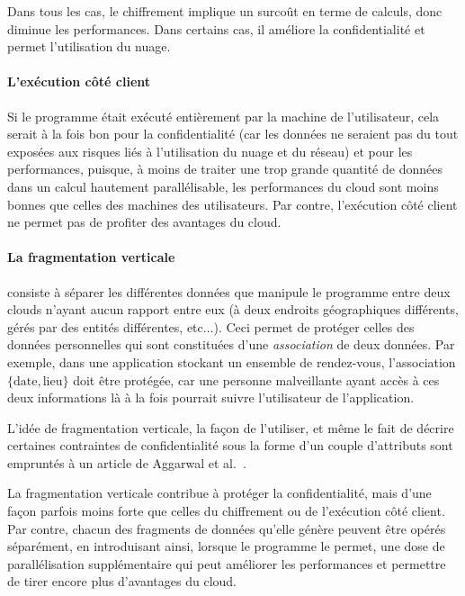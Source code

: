 Dans tous les cas, le chiffrement implique un surcoût en terme de calculs,
donc diminue les performances. Dans certains cas, il améliore la confidentialité
et permet l'utilisation du nuage.

\paragraph{L'exécution côté client}
Si le programme était exécuté entièrement par la machine de l'utilisateur,
cela serait à la fois bon pour la confidentialité (car les données
ne seraient pas du tout exposées aux risques liés à l'utilisation du nuage
et du réseau) et pour les performances, puisque, à moins de traiter une 
trop grande quantité de données dans un calcul hautement parallélisable,
les performances du cloud sont moins bonnes que celles des machines des utilisateurs.
Par contre, l'exécution côté client ne permet pas de profiter des avantages du cloud.

\paragraph{La fragmentation verticale} consiste à séparer les différentes données
que manipule le programme entre deux clouds n'ayant aucun rapport entre eux
(à deux endroits géographiques différents, gérés par des entités différentes,
etc$\dots$).
Ceci permet de protéger celles des données personnelles qui sont constituées d'une
\emph{association} de deux données. Par exemple, dans une application stockant
un ensemble de rendez-vous, l'association $\{\mathrm{date}, \mathrm{lieu}\}$
doit être protégée, car une personne malveillante ayant accès à ces deux
informations là à la fois pourrait suivre l'utilisateur de l'application.

L'idée de fragmentation verticale, la façon de l'utiliser,
et même le fait de décrire certaines contraintes de
confidentialité sous la forme d'un couple d'attributs
sont empruntés à un article de 
Aggarwal et al.~\cite{aggar}.

La fragmentation verticale contribue à protéger la confidentialité,
mais d'une façon parfois moins forte que celles du chiffrement
ou de l'exécution côté client. Par contre, chacun des fragments
de données qu'elle génère peuvent être opérés séparément, en introduisant
ainsi, lorsque le programme le permet, une dose de parallélisation
supplémentaire qui peut améliorer les performances et permettre de tirer
encore plus d'avantages du cloud.

